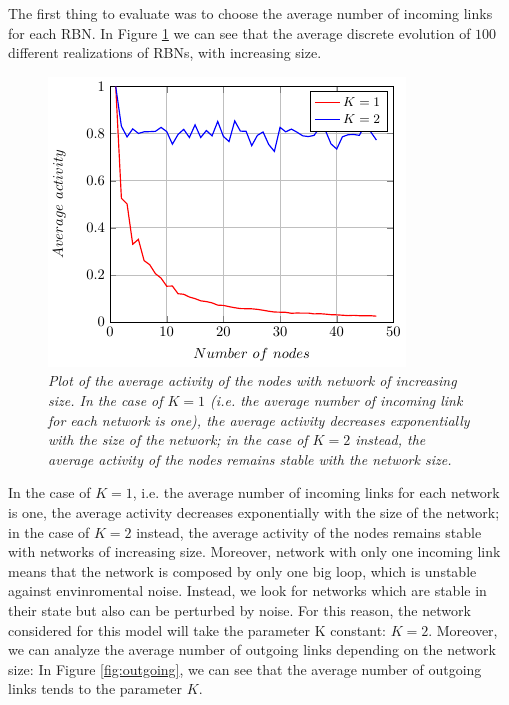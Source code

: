 The first thing to evaluate was to choose the average number of incoming links for each RBN. In Figure \ref{fig:K} we can see that the average discrete evolution of $100$ different realizations of RBNs, with increasing size.
\begin{figure}[h]
\centering
\includegraphics[scale=1.5]{images/K.pdf}
\caption{\emph{Plot of the average activity of the nodes with network of increasing size.
In the case of $K=1$ (i.e. the average number of incoming link for each network is one), the average activity decreases exponentially with the size of the network; in the case of $K=2$ instead, the average activity of the nodes remains stable with the network size.}}
\label{fig:K}
\end{figure}
In the case of $K=1$, i.e. the average number of incoming links for each network is one, the average activity decreases exponentially with the size of the network; in the case of $K=2$ instead, the average activity of the nodes remains stable with networks of increasing size. Moreover, network with only one incoming link means that the network is composed by only one big loop, which is unstable against envinromental noise. Instead, we look for networks which are stable in their state but also can be perturbed by noise. For this reason, the network considered for this model will take the parameter K constant: $K=2$.
Moreover, we can analyze the average number of outgoing links depending on the network size: In Figure \ref{fig:outgoing}, we can see that the average number of outgoing links tends to the parameter $K$.
